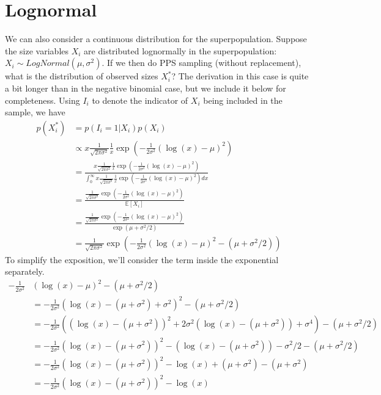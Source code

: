 \documentclass[10pt,a4paper]{article}
\begin{document}
\section*{Lognormal}
We can also consider a continuous distribution for the superpopulation. Suppose the size variables $X_i$ are distributed lognormally in the superpopulation: $X_i \sim LogNormal(\mu, \sigma^2)$. If we then do PPS sampling (without replacement), what is the distribution of observed sizes $X_i^*$? The derivation in this case is quite a bit longer than in the negative binomial case, but we include it below for completeness. Using $I_i$ to denote the indicator of $X_i$ being included in the sample, we have
\begin{align}\label{eq:log1}
	p(X_i^*) &= p(I_i = 1| X_i) p(X_i) \nonumber \\[5pt]
	&\propto x \frac{1}{\sqrt{2 \pi \sigma^2}} \frac{1}{x} \exp \left( -\frac{1}{2 \sigma^2} \left(\log(x) - \mu \right)^2 \right) \nonumber \\[5pt]
	&= \frac{\displaystyle x \frac{1}{\sqrt{2 \pi \sigma^2}} \frac{1}{x} \exp \left( -\frac{1}{2 \sigma^2} \left(\log(x) - \mu \right)^2 \right)}{\displaystyle \int_{0}^{\infty} x \frac{1}{\sqrt{2 \pi \sigma^2}} \frac{1}{x} \exp \left( -\frac{1}{2 \sigma^2} \left(\log(x) - \mu \right)^2 \right) dx} \nonumber \\[5pt]
	&= \frac{\displaystyle \frac{1}{\sqrt{2 \pi \sigma^2}} \exp \left( -\frac{1}{2 \sigma^2} \left(\log(x) - \mu \right)^2 \right)}{\displaystyle \mathbb{E}[X_i]} \nonumber \\[5pt]
	&= \frac{\displaystyle \frac{1}{\sqrt{2 \pi \sigma^2}} \exp \left( -\frac{1}{2 \sigma^2} \left(\log(x) - \mu \right)^2 \right)}{\displaystyle \exp(\mu + \sigma^2 / 2)} \nonumber \\[5pt]
	&= \frac{1}{\sqrt{2 \pi \sigma^2}} \exp \left( -\frac{1}{2 \sigma^2} \left( \log(x) - \mu \right)^2 - (\mu + \sigma^2 / 2) \right)
\end{align}
To simplify the exposition, we'll consider the term inside the exponential separately.
\begin{align*}
	 -\frac{1}{2 \sigma^2} &\left( \log(x) - \mu \right)^2 - (\mu + \sigma^2 / 2) \\[5pt]
	 &= -\frac{1}{2 \sigma^2} \left( \log(x) - (\mu + \sigma^2) + \sigma^2 \right)^2 - (\mu + \sigma^2 / 2) \\[5pt]
	&= -\frac{1}{2 \sigma^2} \left( \left( \log(x) - (\mu + \sigma^2) \right)^2 + 2 \sigma^2 (\log(x) - (\mu + \sigma^2)) + \sigma^4 \right) - (\mu + \sigma^2 / 2) \\[5pt]
	&= -\frac{1}{2 \sigma^2} \left( \log(x) - (\mu + \sigma^2) \right)^2 - (\log(x) - (\mu + \sigma^2)) - \sigma^2 /2 - (\mu + \sigma^2 / 2) \\[5pt]
	&= -\frac{1}{2 \sigma^2} \left( \log(x) - (\mu + \sigma^2) \right)^2 - \log(x) + (\mu + \sigma^2) - (\mu + \sigma^2) \\[5pt]
	&= -\frac{1}{2 \sigma^2} \left( \log(x) - (\mu + \sigma^2) \right)^2 - \log(x)
\end{align*}
\end{document}
